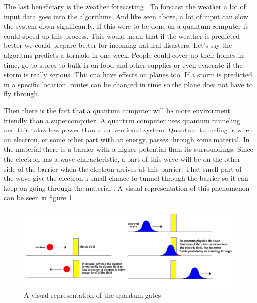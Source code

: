 The last beneficiary is the weather forecasting \autocite{qbenefits}. To forecast the weather a lot of input data goes into the algorithms.
And like seen above, a lot of input can slow the system down significantly. If this were to be done on a quantum computer it could speed up this process.
This would mean that if the weather is predicted better we could prepare better for incoming natural disasters.
Let's say the algoritms predicts a tornado in one week. People could cover up their homes in time, go to stores to bulk in on food and other supplies or even evacuate if the storm is really serious.
This cna have effects on planes too. If a storm is predicted in a specific location, routes can be changed in time so the plane does not have to fly through.

Then there is the fact that a quantum computer will be more environment friendly than a supercomputer. A quantum computer uses quantum tunneling and this takes less power than a conventional system.
Quantum tunneling is when an electron, or some other part with an energy, passes through some material. In the material there is a barrier with a higher potential than its surroundings.
Since the electron has a wave characteristic, a part of this wave will be on the other side of the barrier when the electron arrives at this barrier.
That small part of the wave give the electron a small chance to tunnel through the barrier so it can keep on going  through the material \autocite{imgtunnel}. A visual representation of this phenomenon can be seen in figure \ref{fig:quantum tunneling}.

\begin{figure} [h]
    \centering
    \includegraphics[width=\textwidth]{img/TunnelingAll.png}
        \caption{A visual representation of the quantum gates \autocite{imgtunnel}}
        \label{fig:quantum tunneling}
\end{figure}